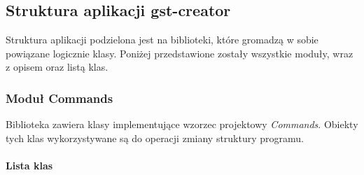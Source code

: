 \documentclass[12pt]{article}
\begin{document}
\subsection{Struktura aplikacji gst-creator}
Struktura aplikacji podzielona jest na biblioteki, które gromadzą w sobie powiązane logicznie klasy. Poniżej przedstawione zostały wszystkie moduły, wraz z opisem oraz listą klas.
\subsubsection{Moduł Commands}
Biblioteka zawiera klasy implementujące wzorzec projektowy \textit{Commands}. Obiekty tych klas wykorzystywane są do operacji zmiany struktury programu.
\paragraph{}
\textbf{Lista klas}
\vspace{-2mm}
\end{document}

